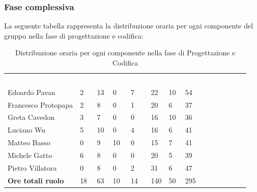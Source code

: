 \subsubsection{Fase complessiva}
La seguente tabella rappresenta la distribuzione oraria per ogni componente del gruppo nella fase di progettazione e codifica:
\begin{table}[H]
\begin{center}
\renewcommand{\arraystretch}{1.25}
\begin{tabular}{ m{}<{\centering}  m{}<{\centering} m{}<{\centering} m{}<{\centering}  m{}<{\centering}  m{}<{\centering}  m{}<{\centering}  m{}<{\centering}   }
	\rowcolor{darkblue}
	\textcolor{white}{\textbf{Componente}} &\textcolor{white}{\textbf{Re}}&\textcolor{white}{\textbf{Pt}}&\textcolor{white}{\textbf{An}}&\textcolor{white}{\textbf{Am}}&\textcolor{white}{\textbf{Pr}}&\textcolor{white}{\textbf{Ve}}&\textcolor{white}{\textbf{Ore complessive}}\\ 
	Edoardo Pavan & 2 & 13 & 0 & 7 & 22 & 10 & 54 \\	
	
	Francesco Protopapa & 2 & 8 & 0 & 1 & 20 & 6 & 37 \\

	Greta Cavedon & 3 & 7 & 0 & 0 & 16 & 10 & 36 \\
	
	Luciano Wu & 5 & 10 & 0 & 4 & 16 & 6 & 41 \\
	
	Matteo Basso & 0 & 9 & 10 & 0 & 15 & 7 & 41 \\
	
	Michele Gatto &  6 & 8 & 0 & 0 & 20 & 5 & 39 \\
	
	Pietro Villatora & 0 & 8 & 0 & 2 & 31 & 6 & 47 \\
	
	\textbf{Ore totali ruolo} & 18 & 63 & 10 & 14 & 140 & 50 & 295\\

\end{tabular}
\caption{Distribuzione oraria per ogni componente nella fase di Progettazione e Codifica}
\end{center}
\end{table}

